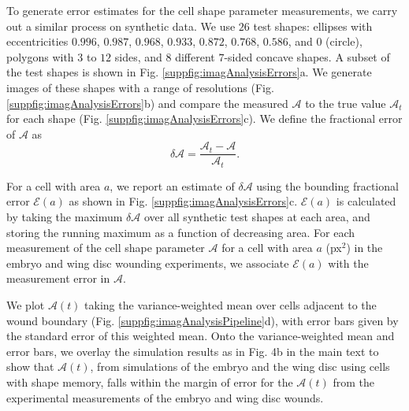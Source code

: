 \documentclass[%
 reprint,
superscriptaddress,
 amsmath,amssymb,
pre,
]{revtex4-2}
\begin{document}
To generate error estimates for the cell shape parameter measurements, we carry out a similar process on synthetic data. We use $26$ test shapes: ellipses with eccentricities $0.996$, $0.987$, $0.968$, $0.933$, $0.872$, $0.768$, $0.586$, and $0$ (circle), polygons with $3$ to $12$ sides, and $8$ different $7$-sided concave shapes. A subset of the test shapes is shown in Fig. \ref{suppfig:imagAnalysisErrors}a. We generate images of these shapes with a range of resolutions (Fig. \ref{suppfig:imagAnalysisErrors}b) and compare the measured $\mathcal{A}$ to the true value ${\mathcal A}_t$ for each shape (Fig. \ref{suppfig:imagAnalysisErrors}c). We define the fractional error of $\mathcal{A}$ as
\begin{equation}
    \delta \mathcal{A} = \frac{\mathcal{A}_{t} - \mathcal{A}}{\mathcal{A}_{t}}.
    \label{suppeq:fractional_error}
\end{equation}

For a cell with area $a$, we report an estimate of $\delta\mathcal{A}$ using the bounding fractional error $\mathcal{E}(a)$ as shown in Fig. \ref{suppfig:imagAnalysisErrors}c. $\mathcal{E}(a)$ is calculated by taking the maximum $\delta\mathcal{A}$ over all synthetic test shapes at each area, and storing the running maximum as a function of decreasing area. For each measurement of the cell shape parameter $\mathcal{A}$ for a cell with area $a$ (px$^2$) in the embryo and wing disc wounding experiments, we associate $\mathcal{E}(a)$ with the measurement error in ${\mathcal A}$. 

We plot $\mathcal{A}(t)$ taking the variance-weighted mean over cells adjacent to the wound boundary (Fig. \ref{suppfig:imagAnalysisPipeline}d), with error bars given by the standard error of this weighted mean. Onto the variance-weighted mean and error bars, we overlay the simulation results as in Fig. 4b in the main text to show that $\mathcal{A}(t)$, from simulations of the embryo and the wing disc using cells with shape memory, falls within the margin of error for the $\mathcal{A}(t)$ from the experimental measurements of the embryo and wing disc wounds. 
\end{document}
